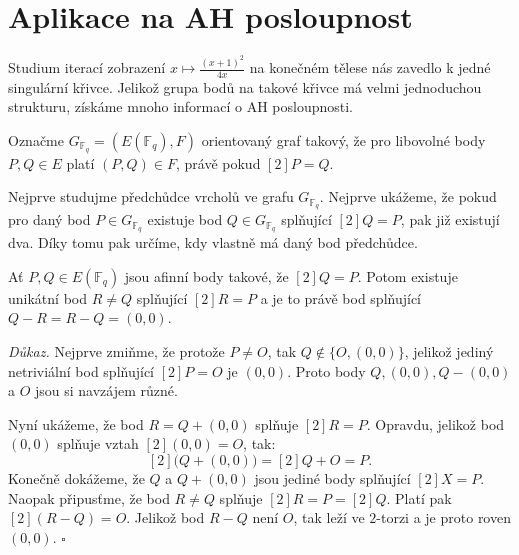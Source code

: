 \documentclass[12pt]{report}
\begin{document}
\section{Aplikace na AH posloupnost}

Studium iterací zobrazení $x \longmapsto \frac{(x+1)^2}{4x}$ na konečném tělese nás zavedlo k jedné singulární křivce. Jelikož grupa bodů na takové křivce má velmi jednoduchou strukturu, získáme mnoho informací o AH posloupnosti. 

\begin{definice}
Označme $G_{\mathbb{F}_q} = (E(\mathbb{F}_q),F)$ orientovaný graf takový, že pro libovolné body $P,Q \in E$ platí $(P,Q) \in F$, právě pokud $[2]P=Q$.
\end{definice}

Nejprve studujme předchůdce vrcholů ve grafu $G_{\mathbb{F}_q}$. Nejprve ukážeme, že pokud pro daný bod $P \in G_{\mathbb{F}_q}$ existuje bod $Q \in G_{\mathbb{F}_q}$ splňující $[2]Q = P$, pak již existují dva. Díky tomu pak určíme, kdy vlastně má daný bod předchůdce.


\begin{veta}\label{dva}
Ať $P,Q \in E(\mathbb{F}_q)$ jsou afinní body takové, že $[2]Q = P$. Potom existuje unikátní bod $R \neq Q$ splňující $[2]R = P$ a je to právě bod splňující $Q-R = R-Q = (0,0)$.
\end{veta}

\noindent\textit{Důkaz.} Nejprve zmiňme, že protože $P \neq O$, tak $Q \not\in \lbrace O,(0,0) \rbrace$, jelikož jediný netriviální bod splňující $[2]P = O$ je $(0,0)$. Proto body $Q,(0,0), Q-(0,0)$ a $O$ jsou si navzájem různé.

Nyní ukážeme, že bod $R=Q+(0,0)$ splňuje $[2]R=P$. Opravdu, jelikož bod $(0,0)$ splňuje vztah $[2](0,0) = O$, tak:
$$[2]\big(Q+(0,0)\big) = [2]Q  + O= P.$$
Konečně dokážeme, že $Q$ a $Q+(0,0)$ jsou jediné body splňující $[2]X = P$.  Naopak připusťme, že bod $R \neq Q$ splňuje $[2]R = P = [2]Q$. Platí pak $[2](R-Q) = O$. Jelikož bod $R-Q$ není $O$, tak leží ve $2$-torzi a je proto roven $(0,0)$. \hfill $\square$\\


\end{document}
